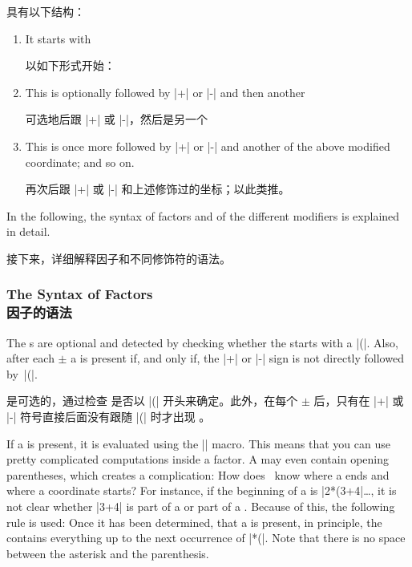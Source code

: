  具有以下结构：
%
\begin{enumerate}
    \item It starts with

        以如下形式开始：
        \begin{quote}
        \end{quote}
    \item This is optionally followed by |+| or |-| and then another

    可选地后跟 |+| 或 |-|，然后是另一个
        \begin{quote}
        \end{quote}
    \item This is once more followed by |+| or |-| and another of the above
        modified coordinate; and so on.

        再次后跟 |+| 或 |-| 和上述修饰过的坐标；以此类推。
\end{enumerate}

In the following, the syntax of factors and of the different modifiers
is explained in detail.

接下来，详细解释因子和不同修饰符的语法。


\subsubsection{The Syntax of Factors\\因子的语法}

The s are optional and detected by checking whether the
 starts with a |(|. Also, after each $\pm$ a
 is present if, and only if, the |+| or |-| sign is not directly
followed by~|(|.

是可选的，通过检查  是否以 |(| 开头来确定。此外，在每个 $\pm$ 后，只有在 |+| 或 |-| 符号直接后面没有跟随 |(| 时才出现 。

If a  is present, it is evaluated using the |\pgfmathparse| macro.
This means that you can use pretty complicated computations inside a factor. A
 may even contain opening parentheses, which creates a
complication: How does \tikzname\ know where a  ends and where a
coordinate starts? For instance, if the beginning of a  is |2*(3+4|\dots, it is not clear whether |3+4| is part of a
 or part of a . Because of this, the following
rule is used: Once it has been determined, that a  is present, in
principle, the  contains everything up to the next occurrence of
|*(|. Note that there is no space between the asterisk and the parenthesis.

